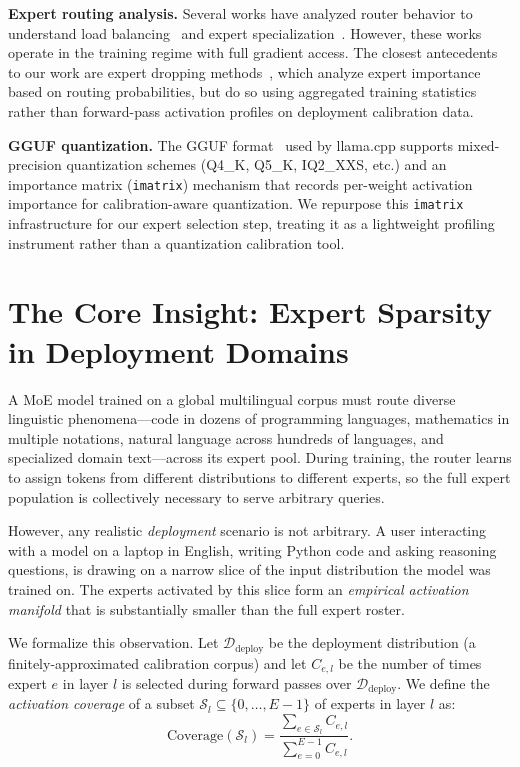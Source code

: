 \documentclass[10pt]{article}
\begin{document}
\textbf{Expert routing analysis.} Several works have analyzed router behavior to understand load balancing~\cite{lepikhin2021gshard} and expert specialization~\cite{fedus2022switch}. However, these works operate in the training regime with full gradient access. The closest antecedents to our work are expert dropping methods~\cite{chen2022task}, which analyze expert importance based on routing probabilities, but do so using aggregated training statistics rather than forward-pass activation profiles on deployment calibration data.

\textbf{GGUF quantization.} The GGUF format~\cite{llama_cpp} used by llama.cpp supports mixed-precision quantization schemes (Q4\_K, Q5\_K, IQ2\_XXS, etc.) and an importance matrix (\texttt{imatrix}) mechanism that records per-weight activation importance for calibration-aware quantization. We repurpose this \texttt{imatrix} infrastructure for our expert selection step, treating it as a lightweight profiling instrument rather than a quantization calibration tool.

\section{The Core Insight: Expert Sparsity in Deployment Domains}
\label{sec:insight}

A MoE model trained on a global multilingual corpus must route diverse linguistic phenomena---code in dozens of programming languages, mathematics in multiple notations, natural language across hundreds of languages, and specialized domain text---across its expert pool. During training, the router learns to assign tokens from different distributions to different experts, so the full expert population is collectively necessary to serve arbitrary queries.

However, any realistic \emph{deployment} scenario is not arbitrary. A user interacting with a model on a laptop in English, writing Python code and asking reasoning questions, is drawing on a narrow slice of the input distribution the model was trained on. The experts activated by this slice form an \emph{empirical activation manifold} that is substantially smaller than the full expert roster.

We formalize this observation. Let $\mathcal{D}_\text{deploy}$ be the deployment distribution (a finitely-approximated calibration corpus) and let $C_{e,l}$ be the number of times expert $e$ in layer $l$ is selected during forward passes over $\mathcal{D}_\text{deploy}$. We define the \emph{activation coverage} of a subset $\mathcal{S}_l \subseteq \{0, \ldots, E-1\}$ of experts in layer $l$ as:
\begin{equation}
  \text{Coverage}(\mathcal{S}_l) = \frac{\sum_{e \in \mathcal{S}_l} C_{e,l}}{\sum_{e=0}^{E-1} C_{e,l}}.
  \label{eq:coverage}
\end{equation}
\end{document}
